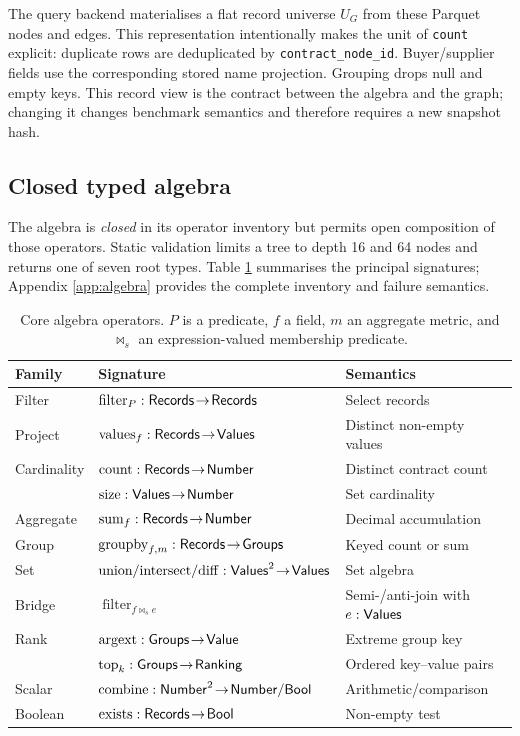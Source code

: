 The query backend materialises a flat record universe $U_G$ from these Parquet nodes and edges.
This representation intentionally makes the unit of \texttt{count} explicit: duplicate rows are
deduplicated by \texttt{contract\_node\_id}.  Buyer/supplier fields use the corresponding stored
name projection.  Grouping drops null and empty keys.  This record view is the contract between
the algebra and the graph; changing it changes benchmark semantics and therefore requires a new
snapshot hash.

\subsection{Closed typed algebra}
\label{sec:algebra}

The algebra is \emph{closed} in its operator inventory but permits open composition of those
operators.  Static validation limits a tree to depth 16 and 64 nodes and returns one of seven
root types.  Table \ref{tab:operators} summarises the principal signatures; Appendix
\ref{app:algebra} provides the complete inventory and failure semantics.

\begin{table}[t]
  \caption{Core algebra operators.  $P$ is a predicate, $f$ a field, $m$ an aggregate metric,
  and $\bowtie_s$ an expression-valued membership predicate.}
  \label{tab:operators}
  \centering
  \small
  \begin{tabular}{lll}
    \toprule
    Family & Signature & Semantics \\
    \midrule
    Filter & $\operatorname{filter}_{P}:\mathsf{Records}\!\to\!\mathsf{Records}$ & Select records \\
    Project & $\operatorname{values}_{f}:\mathsf{Records}\!\to\!\mathsf{Values}$ & Distinct non-empty values \\
    Cardinality & $\operatorname{count}:\mathsf{Records}\!\to\!\mathsf{Number}$ & Distinct contract count \\
                & $\operatorname{size}:\mathsf{Values}\!\to\!\mathsf{Number}$ & Set cardinality \\
    Aggregate & $\operatorname{sum}_{f}:\mathsf{Records}\!\to\!\mathsf{Number}$ & Decimal accumulation \\
    Group & $\operatorname{groupby}_{f,m}:\mathsf{Records}\!\to\!\mathsf{Groups}$ & Keyed count or sum \\
    Set & $\operatorname{union/intersect/diff}:\mathsf{Values}^2\!\to\!\mathsf{Values}$ & Set algebra \\
    Bridge & $\operatorname{filter}_{f\bowtie_s e}$ & Semi-/anti-join with $e:\mathsf{Values}$ \\
    Rank & $\operatorname{argext}:\mathsf{Groups}\!\to\!\mathsf{Value}$ & Extreme group key \\
         & $\operatorname{top}_k:\mathsf{Groups}\!\to\!\mathsf{Ranking}$ & Ordered key--value pairs \\
    Scalar & $\operatorname{combine}:\mathsf{Number}^2\!\to\!\mathsf{Number}/\mathsf{Bool}$ & Arithmetic/comparison \\
    Boolean & $\operatorname{exists}:\mathsf{Records}\!\to\!\mathsf{Bool}$ & Non-empty test \\
    \bottomrule
  \end{tabular}
\end{table}

